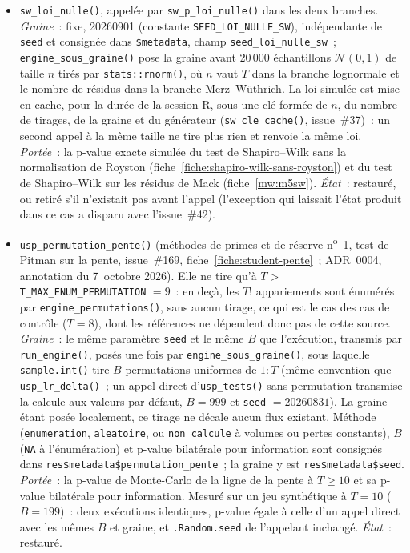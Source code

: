 \documentclass[a4paper,11pt]{article}
\newcommand{\code}[1]{\texttt{\small #1}}
\begin{document}
\begin{itemize}
  \emph{Graine}~: le même paramètre \code{seed}, posé une seule fois avant la boucle par
  \code{engine\_sous\_graine()}~; à chaque réplication,
  \code{mw\_simuler\_triangle()} tire avec remise, par \code{sample()}, les
  résidus du vivier recentré. \emph{Portée}~: tous les résultats de Monte-Carlo
  de la branche Merz--Wüthrich (p-values Monte-Carlo, \code{sigma\_boot} et
  l'intervalle qui en est tiré). \emph{État}~: restauré.
\item \code{sw\_loi\_nulle()}, appelée par \code{sw\_p\_loi\_nulle()} dans les
  deux branches. \emph{Graine}~: fixe, 20260901 (constante \code{SEED\_LOI\_NULLE\_SW}),
  indépendante de \code{seed} et consignée dans \code{\$metadata}, champ
  \code{seed\_loi\_nulle\_sw}~;
  \code{engine\_sous\_graine()} pose la graine avant 20\,000 échantillons $\mathcal{N}(0,1)$ de
  taille $n$ tirés par \code{stats::rnorm()}, où $n$ vaut $T$ dans la branche
  lognormale et le nombre de résidus dans la branche Merz--Wüthrich. La loi
  simulée est mise en cache, pour la durée de la session R, sous une clé formée
  de $n$, du nombre de tirages, de la graine et du générateur (\code{sw\_cle\_cache()},
  issue~\#37)~: un second appel à la même taille ne tire plus rien et renvoie la même loi. \emph{Portée}~: la p-value
  exacte simulée du test de Shapiro--Wilk sans la normalisation de Royston
  (fiche~\ref{fiche:shapiro-wilk-sans-royston}) et du test de Shapiro--Wilk sur les résidus de Mack
  (fiche~\ref{mw:m5sw}).
  \emph{État}~: restauré, ou retiré s'il n'existait pas avant l'appel (l'exception qui
  laissait l'état produit dans ce cas a disparu avec l'issue~\#42).
\item \code{usp\_permutation\_pente()} (méthodes de primes et de réserve n\textsuperscript{o}~1,
  test de Pitman sur la pente, issue~\#169, fiche~\ref{fiche:student-pente}~; ADR~0004, annotation
  du 7~octobre 2026). Elle ne tire qu'à $T >$ \code{T\_MAX\_ENUM\_PERMUTATION} $= 9$~: en deçà,
  les $T!$ appariements sont énumérés par \code{engine\_permutations()}, sans aucun tirage, ce qui
  est le cas des cas de contrôle ($T = 8$), dont les références ne dépendent donc pas de cette
  source. \emph{Graine}~: le même paramètre \code{seed} et le même $B$ que l'exécution, transmis
  par \code{run\_engine()}, posés une fois par \code{engine\_sous\_graine()}, sous laquelle
  \code{sample.int()} tire $B$ permutations uniformes de $1{:}T$ (même convention que
  \code{usp\_lr\_delta()}~; un appel direct d'\code{usp\_tests()} sans permutation transmise la
  calcule aux valeurs par défaut, $B = 999$ et \code{seed} $= 20260831$). La graine étant posée
  localement, ce tirage ne décale aucun flux existant. Méthode (\code{enumeration},
  \code{aleatoire}, ou \code{non calcule} à volumes ou pertes constants), $B$ (\code{NA} à
  l'énumération) et p-value bilatérale pour information sont consignés dans
  \code{res\$metadata\$permutation\_pente}~; la graine y est \code{res\$metadata\$seed}.
  \emph{Portée}~: la p-value de Monte-Carlo de la ligne de la pente à $T \ge 10$ et sa p-value
  bilatérale pour information. Mesuré sur un jeu synthétique à $T = 10$ ($B = 199$)~: deux
  exécutions identiques, p-value égale à celle d'un appel direct avec les mêmes $B$ et graine, et
  \code{.Random.seed} de l'appelant inchangé. \emph{État}~: restauré.
\end{itemize}
\end{document}
